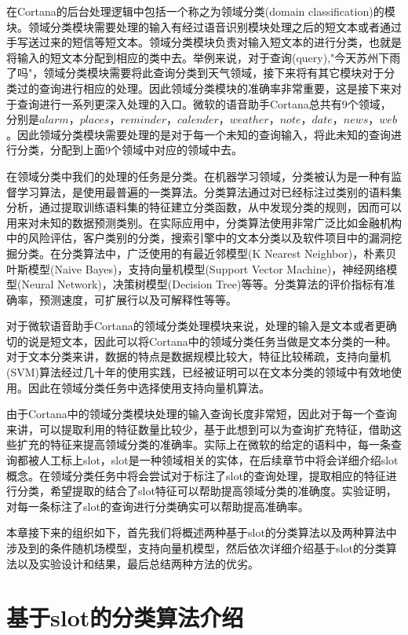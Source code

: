 \documentclass[master]{njuthesis}
\begin{document}
    在Cortana的后台处理逻辑中包括一个称之为领域分类(domain classification)的模块。领域分类模块需要处理的输入有经过语音识别模块处理之后的短文本或者通过手写送过来的短信等短文本。领域分类模块负责对输入短文本的进行分类，也就是将输入的短文本分配到相应的类中去。举例来说，对于查询(query),"今天苏州下雨了吗"，领域分类模块需要将此查询分类到天气领域，接下来将有其它模块对于分类过的查询进行相应的处理。因此领域分类模块的准确率非常重要，这是接下来对于查询进行一系列更深入处理的入口。微软的语音助手Cortana总共有9个领域，分别是$alarm，places，reminder，calender，weather，note，date，news，web$。因此领域分类模块需要处理的是对于每一个未知的查询输入，将此未知的查询进行分类，分配到上面9个领域中对应的领域中去。

    在领域分类中我们的处理的任务是分类。在机器学习领域，分类被认为是一种有监督学习算法，是使用最普遍的一类算法。分类算法通过对已经标注过类别的语料集分析，通过提取训练语料集的特征建立分类函数，从中发现分类的规则，因而可以用来对未知的数据预测类别。在实际应用中，分类算法使用非常广泛比如金融机构中的风险评估，客户类别的分类，搜索引擎中的文本分类以及软件项目中的漏洞挖掘分类。在分类算法中，广泛使用的有最近邻模型(K Nearest Neighbor)，朴素贝叶斯模型(Naive Bayes)，支持向量机模型(Support Vector Machine)，神经网络模型(Neural Network)，决策树模型(Decision Tree)等等。分类算法的评价指标有准确率，预测速度，可扩展行以及可解释性等等。
    
    对于微软语音助手Cortana的领域分类处理模块来说，处理的输入是文本或者更确切的说是短文本，因此可以将Cortana中的领域分类任务当做是文本分类的一种。对于文本分类来讲，数据的特点是数据规模比较大，特征比较稀疏，支持向量机(SVM)算法经过几十年的使用实践，已经被证明可以在文本分类的领域中有效地使用。因此在领域分类任务中选择使用支持向量机算法。
    
    由于Cortana中的领域分类模块处理的输入查询长度非常短，因此对于每一个查询来讲，可以提取利用的特征数量比较少，基于此想到可以为查询扩充特征，借助这些扩充的特征来提高领域分类的准确率。实际上在微软的给定的语料中，每一条查询都被人工标上slot，slot是一种领域相关的实体，在后续章节中将会详细介绍slot概念。在领域分类任务中将会尝试对于标注了slot的查询处理，提取相应的特征进行分类，希望提取的结合了slot特征可以帮助提高领域分类的准确度。实验证明，对每一条标注了slot的查询进行分类确实可以帮助提高准确率。
    
    本章接下来的组织如下，首先我们将概述两种基于slot的分类算法以及两种算法中涉及到的条件随机场模型，支持向量机模型，然后依次详细介绍基于slot的分类算法以及实验设计和结果，最后总结两种方法的优劣。

    
\section{基于slot的分类算法介绍}
   
\end{document}
